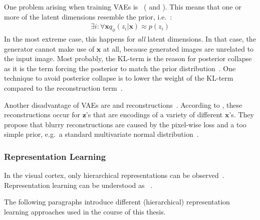 One problem arising when training \acp{VAE} is ~(\citep{lucas2019understanding} and \citep[p. 694]{Goodfellow-et-al-2016}).
This means that one or more of the latent dimensions resemble the prior, i.e.~\citep{lucas2019understanding}:
\begin{align}
    \exists i: \forall \mathbf{x} q_{\phi}\left(z_{i} | \mathbf{x}\right) \approx p\left(z_{i}\right)
\end{align}
In the most extreme case, this happens for \textit{all} latent dimensions.
In that case, the generator cannot make use of $\bm{x}$ at all, because generated images are unrelated to the input image.
Most probably, the KL-term is the reason for posterior collapse as it is the term forcing the posterior to match the prior distribution~\citep{lucas2019understanding}.
One technique to avoid posterior collapse is to lower the weight of the KL-term compared to the reconstruction term~\citep{lucas2019understanding}.

Another disadvantage of \acp{VAE} are  and  reconstructions~\citep{zhao2017towards}.
According to \citet{zhao2017towards}, these reconstructions occur for $\bm{z}$'s that are encodings of a variety of different $\bm{x}$'s.
They propose that blurry reconstructions are caused by the pixel-wise loss and a too simple prior, e.g.~a standard multivariate normal distribution~\citep{zhao2017towards}.

\subsubsection{Representation Learning}\label{subsubsec:representation_learning}
In the visual cortex, only hierarchical representations can be observed~\citep{rodriguez2015hierarchical}.
Representation learning can be understood as ~\citep{bengio2013representation}.

The following paragraphs introduce different (hierarchical) representation learning approaches used in the course of this thesis.

